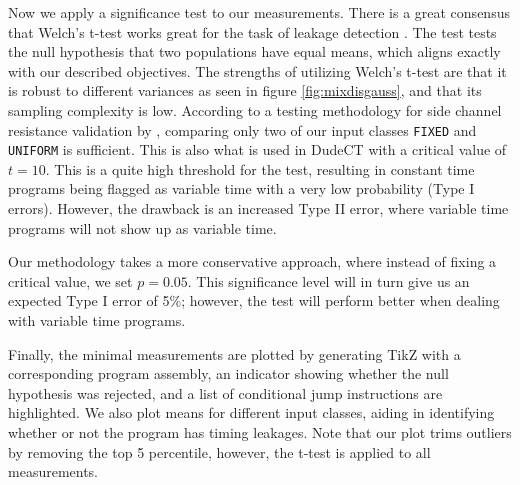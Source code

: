 Now we apply a significance test to our measurements. There is a great consensus that Welch's t-test \cite{WELCH1947} works great for the task of leakage detection \cite{cryptoeprint:2015/536}.
The test tests the null hypothesis that two populations have equal means, which aligns exactly with our described objectives. The strengths of utilizing Welch's t-test are that it is robust to different variances as seen in figure \ref{fig:mixdisgauss}, and that its sampling complexity is low. According to a testing methodology for side channel resistance validation by \citeauthor{Goodwill2011ATM}, comparing only two of our input classes \texttt{FIXED} and \texttt{UNIFORM} is sufficient.
This is also what is used in DudeCT \cite{dudect} with a critical value of $t = 10$. 
This is a quite high threshold for the test, resulting in constant time programs being flagged as variable time with a very low probability (Type I errors).
However, the drawback is an increased Type II error, where variable time programs will not show up as variable time.

Our methodology takes a more conservative approach, where instead of fixing a critical value, we set $p = 0.05$. This significance level will in turn give us an expected Type I error of 5\%; however, the test will perform better when dealing with variable time programs.

Finally, the minimal measurements are plotted by generating TikZ with a corresponding program assembly, an indicator showing whether the null hypothesis was rejected, and a list of conditional jump instructions are highlighted. We also plot means for different input classes, aiding in identifying whether or not the program has timing leakages. Note that our plot trims outliers by removing the top 5 percentile, however, the t-test is applied to all measurements.

